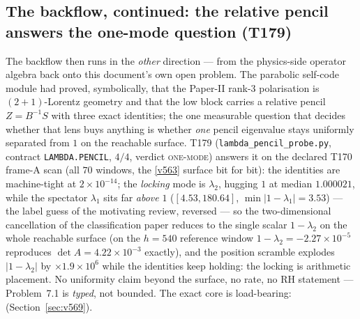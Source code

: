 \documentclass[11pt,a4paper]{article}
\begin{document}
\subsection{The backflow, continued: the relative pencil answers the one-mode question (T179)}\label{sec:t179}
The backflow then runs in the \emph{other} direction --- from the physics-side
operator algebra back onto this document's own open problem. The parabolic
self-code module had proved, symbolically, that the Paper-II rank-3
polarisation is $(2{+}1)$-Lorentz geometry and that the low block carries a
relative pencil $Z=B^{-1}S$ with three exact identities; the one measurable
question that decides whether that lens buys anything is whether \emph{one}
pencil eigenvalue stays uniformly separated from $1$ on the reachable surface.
T179 (\texttt{lambda\_pencil\_probe.py}, contract \texttt{LAMBDA.PENCIL},
$4/4$, verdict \textsc{one-mode}) answers it on the declared T170 frame-A scan
(all $70$ windows, the \vref{v563} surface bit for bit): the identities are
machine-tight at $2\times10^{-14}$; the \emph{locking} mode is $\lambda_2$,
hugging $1$ at median $1.000021$, while the spectator $\lambda_1$ sits far
\emph{above} $1$ ($[4.53,180.64]$, $\min|1-\lambda_1|=3.53$) --- the label
guess of the motivating review, reversed --- so the two-dimensional
cancellation of the classification paper reduces to the single scalar
$1-\lambda_2$ on the whole reachable surface (on the $h=540$ reference window
$1-\lambda_2=-2.27\times10^{-5}$ reproduces $\det\hat A=4.22\times10^{-3}$
exactly), and the position scramble explodes $|1-\lambda_2|$ by
$\times1.9\times10^{6}$ while the identities keep holding: the locking is
arithmetic placement. No uniformity claim beyond the surface, no rate, no RH
statement --- Problem~7.1 is \emph{typed}, not bounded. The exact core is
load-bearing: 
(Section~\ref{sec:v569}).
\end{document}
